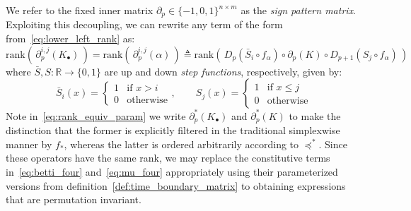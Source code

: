 \documentclass[10pt]{article}
\numberwithin{equation}{section}
\newcommand{\+}{%
	\raisebox{0.18ex}{\scaleobj{0.55}{+}}
}
\theoremstyle{definition}
\theoremstyle{definition}
\begin{document}
We refer to the fixed inner matrix $\partial_p \in \{-1, 0, 1\}^{n \times m}$ as the \emph{sign pattern matrix}.
Exploiting this decoupling, we can rewrite any term of the form from~\eqref{eq:lower_left_rank} as:
\begin{equation}\label{eq:rank_equiv_param}
	\mathrm{rank}(\, \partial_p^{i,j}(K_\bullet) \, ) = \mathrm{rank}(\, \partial_p^{i,j}(\alpha) \, ) \triangleq \mathrm{rank}\!\left( \, D_p(\bar{S}_i \circ f_\alpha) \circ \partial_p(K) \circ D_{p+1}(S_j \circ f_\alpha) \, \right)
\end{equation}
where $\bar{S}, S : \mathbb{R} \to \{0,1\}$ are up and down \emph{step functions}, respectively, given by: 
\begin{equation}\label{eq:step_functions}
	\bar{S}_i(x) = \begin{cases} 1 & \text{if } x > i \\ 0 & \text{otherwise}\end{cases}, \quad \quad S_j(x) = \begin{cases} 1 & \text{if } x \leq j \\ 0 & \text{otherwise}\end{cases}
\end{equation}
Note in~\eqref{eq:rank_equiv_param} we write $\partial_p^\ast(K_\bullet)$ and $\partial_p^\ast(K)$ to make the distinction that the former is explicitly filtered in the traditional simplexwise manner by $f_\ast$, whereas the latter is ordered arbitrarily according to $\preceq^\ast$. 
Since these operators have the same rank, we may replace the constitutive terms in~\eqref{eq:betti_four} and~\eqref{eq:mu_four} appropriately using their parameterized versions from definition~\ref{def:time_boundary_matrix} to obtaining expressions that are permutation invariant. 

\end{document}
